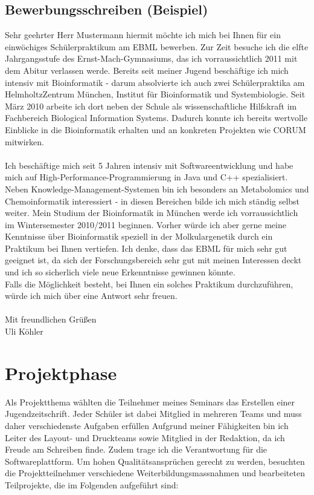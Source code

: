 \documentclass[a4paper,12pt,twoside]{scrbook}
\begin{document}
\section{Bewerbungsschreiben (Beispiel)}
Sehr geehrter Herr Mustermann
hiermit möchte ich mich bei Ihnen für ein einwöchiges Schülerpraktikum am EBML bewerben.
Zur Zeit besuche ich die elfte Jahrgangsstufe des Ernst-Mach-Gymnasiums, das ich vorraussichtlich 2011 mit dem Abitur verlassen werde.
Bereits seit meiner Jugend beschäftige ich mich intensiv mit Bioinformatik - darum absolvierte ich auch zwei Schülerpraktika am HelmholtzZentrum München, Institut für Bioinformatik und Systembiologie.
Seit März 2010 arbeite ich dort neben der Schule als wissenschaftliche Hilfskraft im Fachbereich Biological Information Systems. Dadurch konnte ich bereits wertvolle Einblicke in die Bioinformatik erhalten und an konkreten Projekten wie CORUM mitwirken.\\\\
Ich beschäftige mich seit 5 Jahren intensiv mit Softwareentwicklung und habe mich auf High-Performance-Programmierung in Java und C++ spezialisiert.
Neben Knowledge-Management-Systemen bin ich besonders an Metabolomics und Chemoinformatik interessiert - in diesen Bereichen bilde ich mich ständig selbst weiter.
Mein Studium der Bioinformatik in München werde ich vorraussichtlich im Wintersemester 2010/2011 beginnen.
Vorher würde ich aber gerne meine Kenntnisse über Bioinformatik speziell in der Molkulargenetik durch ein Praktikum bei Ihnen vertiefen.
Ich denke, dass das EBML für mich sehr gut geeignet ist, da sich der Forschungsbereich sehr gut mit meinen Interessen deckt und ich so sicherlich viele neue Erkenntnisse gewinnen könnte.\\
Falls die Möglichkeit besteht, bei Ihnen ein solches Praktikum durchzuführen, würde ich mich über eine Antwort sehr freuen.\\\\
Mit freundlichen Grüßen\\
Uli Köhler
\chapter{Projektphase}
Als Projektthema wählten die Teilnehmer meines Seminars das Erstellen einer Jugendzeitschrift.
Jeder Schüler ist dabei Mitglied in mehreren Teams und muss daher verschiedenste Aufgaben erfüllen
Aufgrund meiner Fähigkeiten bin ich Leiter des Layout- und Druckteams sowie Mitglied in der Redaktion, da ich Freude am Schreiben finde.
Zudem trage ich die Verantwortung für die Softwareplattform.
Um hohen Qualitätsansprüchen gerecht zu werden, besuchten die Projektteilnehmer verschiedene Weiterbildungsmassnahmen und bearbeiteten Teilprojekte, die im Folgenden aufgeführt sind:
\end{document}
